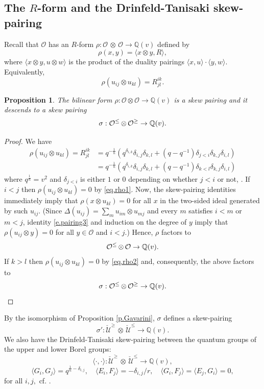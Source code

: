 \documentclass[11pt]{amsart}
\theoremstyle{plain}
\newtheorem{proposition}[theorem]{Proposition}
\theoremstyle{definition}
\newcommand{\beq}{\begin{equation}}
\newcommand{\eeq}{\end{equation}}
\newcommand{\bpro}{\begin{proposition}}
\newcommand{\epro}{\end{proposition}}
\newcommand{\bpr}{\begin{proof}}
\newcommand{\epr}{\end{proof}}
\newcommand{\la}{\langle}
\newcommand{\ra}{\rangle}
\def\BQ{\mathbb Q}
\def\Q{\mathbb Q}
\def\ot{{\otimes}}
\def\Qv{{\BQ(v)}}
\def\Uc{{\check {\mathcal U}}}
\def\O{{\mathcal O}}
\begin{document}
\subsection{The $R$-form and the Drinfeld-Tanisaki skew-pairing}
\label{s.Rform}
  
Recall that $\O$ has an $R$-form $\rho: \O\, \ot\, \O\to \Qv$ defined by
\beq\label{e.coR}
  \rho(x,y)=\la x\otimes y, R\ra,
  \eeq
  where $\la x\otimes y, u\otimes w\ra$ is the product of the duality pairings  $\la x, u\ra\cdot \la y, w\ra.$ 
  Equivalently,  
  $$\rho(u_{ij} \ot u_{kl} )= R^{ik}_{jl}.$$

  \bpro
  The bilinear form $\rho:\O\ot \O\to \Qv$ is a skew pairing and it descends to a skew pairing 
  $$\sigma: \On \, \ot \, \Op \to \Qv.$$
  \epro
  
  \bpr We have 
  \begin{align}
  \rho(u_{ij}\ot u_{kl})=R^{ik}_{jl}&=
  q^{-\frac 1n} \left(q^{ \delta_{i,k}} \delta_{i,j} \delta_{k,l} + (q-q^{-1})
  \delta_{j<i} \delta_{k,j} \delta_{i,l}\right)
  \label{eq.rho1}
  \\
  &= q^{-\frac 1n} \left(q^{ \delta_{i,k}} \delta_{i,j} \delta_{k,l} + (q-q^{-1})
  \delta_{k<l} \delta_{k,j} \delta_{i,l}\right) \label{eq.rho2}
  \end{align}
  where $q^\frac1n=v^2$ and $\delta_{j<i}$ is either $1$ or $0$ depending on whether $j<i$ or not,
   \cite[Sec. 8.4.2(60)]{KS}. 
If $i<j$ then $\rho(u_{ij}\ot u_{kl})=0$ by \eqref{eq.rho1}.  Now, the skew-pairing identities immediately imply that  $\rho(x\ot u_{kl})=0$ for all $x$ in the two-sided ideal generated by such $u_{ij}$. (Since $\Delta(u_{ij})=\sum_m u_{im}\ot u_{mj}$ and every $m$ satisfies $i<m$ or $m<j$, identity \eqref{e.pairing3} and induction on the degree of $y$ imply that $\rho(u_{ij}\ot y)=0$ for all $y\in \O$ and $i<j$.) 
Hence,  $\rho$ factors to 
$$\On \, \ot \, \O \to \Qv.$$
If $k>l$ then $\rho(u_{ij}\ot u_{kl})=0$ by \eqref{eq.rho2} and, consequently, the above factors to 
$$\sigma: \On \, \ot \, \Op \to \Qv.$$
\epr

By the isomorphism of Proposition \ref{p.Gavarini}, $\sigma$ defines a skew-pairing
$$\sigma': \Uc^{\ge}\, \ot\, \Uc^{\le}\to \Qv.$$ We also have the Drinfeld-Tanisaki skew-pairing between the quantum groups of the upper and lower Borel groups:
$$\la\cdot ,\cdot \ra: \Uc^{\ge}\, \ot\, \Uc^{\le}\to \Q(v),$$
\beq\label{e.standardpair}
\la G_i,G_j\ra =q^{\frac1n-\delta_{i,j}},\quad \la E_i,F_j\ra=- \delta_{i,j}/r, \quad \la G_i,F_j\ra=\la E_j,G_i\ra=0,
\eeq
for all $i,j,$ cf. \cite[(6.82)]{KS}. 
\end{document}
